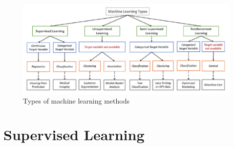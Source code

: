 \begin{figure}[H]
    \begin{center}
        \includegraphics[width=\textwidth]{chapters/3_images/type_of_ml_methods.png}
    \end{center}
    \caption{Types of machine learning methods}
    \label{fig:type_of_ml_methods}
\end{figure}
\section{Supervised Learning}

